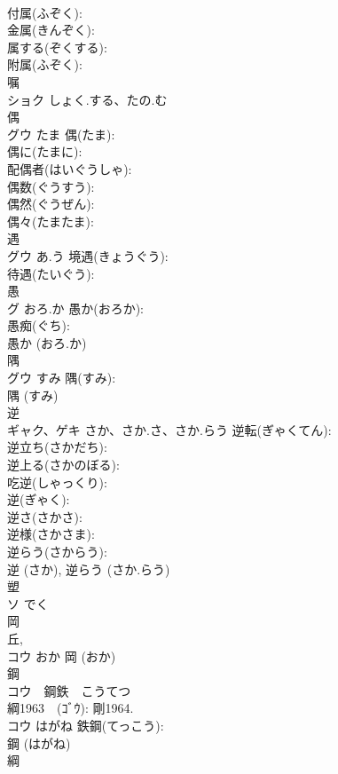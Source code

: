 \documentclass[8pt]{extreport}
\begin{document}
\begin{CJK}{UTF8}{min}
\\	付属(ふぞく): 
\\	金属(きんぞく): 
\\	属する(ぞくする): 
\\	附属(ふぞく): 
\\	嘱			
\\	ショク	しょく.する、たの.む		
\\	偶			
\\	グウ	たま	偶(たま): 
\\	偶に(たまに): 
\\	配偶者(はいぐうしゃ): 
\\	偶数(ぐうすう): 
\\	偶然(ぐうぜん): 
\\	偶々(たまたま): 
\\	遇			
\\	グウ	あ.う	境遇(きょうぐう): 
\\	待遇(たいぐう): 
\\	愚			
\\	グ	おろ.か	愚か(おろか): 
\\	愚痴(ぐち): 
\\	愚か (おろ.か)
\\	隅			
\\	グウ	すみ	隅(すみ): 
\\	隅 (すみ)
\\	逆			
\\	ギャク、ゲキ	さか、さか.さ、さか.らう	逆転(ぎゃくてん): 
\\	逆立ち(さかだち): 
\\	逆上る(さかのぼる): 
\\	吃逆(しゃっくり): 
\\	逆(ぎゃく): 
\\	逆さ(さかさ): 
\\	逆様(さかさま): 
\\	逆らう(さからう): 
\\	逆 (さか), 逆らう (さか.らう)
\\	塑			
\\	ソ	でく		
\\	岡			
\\	丘, 
\\	コウ	おか		岡 (おか)
\\	鋼			
\\	コウ　鋼鉄　こうてつ
\\	綱1963　(ｺﾞｳ): 剛1964.	
\\	コウ	はがね	鉄鋼(てっこう): 
\\	鋼 (はがね)
\\	綱			

\end{CJK}
\end{document}
